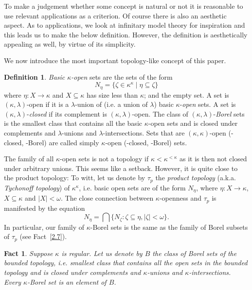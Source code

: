 \documentclass[12pt,a4paper]{amsart}
\newtheorem{fact}[thm]{Fact}
\theoremstyle{definition}
\newtheorem{defn}[thm]{Definition}
\theoremstyle{remark}
\renewcommand{\mid}{\mathrel{|}\allowbreak}
\begin{document}
To make a judgement whether some concept is natural or not it is reasonable to use relevant applications as a criterion. Of course there is also an aesthetic aspect. As to applications, we look at infinitary model theory for inspiration and this leads us to make the below definition. However, the definition is aesthetically appealing as well, by virtue of its simplicity.

We now introduce the most important topology-like concept of this paper.

\begin{defn}\label{kappaopen}
    \emph{Basic $\kappa$-open} sets are the sets of the form $$N_\eta=\{\zeta\in \kappa^\kappa\mid\eta\subseteq \zeta\}$$ where $\eta:X\rightarrow \kappa$  and $X\subseteq \kappa$ has size less than $\kappa$; and the empty set. A set is $(\kappa,\lambda)$-open if it is a $\lambda$-union of (i.e. a union of $\lambda$)  basic $\kappa$-\emph{open} sets. A set is $(\kappa,\lambda)$-\emph{closed} if its complement is $(\kappa,\lambda)$-open. The class of $(\kappa,\lambda)$-\emph{Borel}  sets is the smallest class that contains all the basic $\kappa$-open sets and is closed under complements and $\lambda$-unions and $\lambda$-intersections.
Sets that are $(\kappa,\kappa)$-open (-closed, -Borel) are called simply $\kappa$-open (-closed, -Borel) sets.
\end{defn}

The family of all $\kappa$-open sets is not a topology if $\kappa<\kappa^{<\kappa}$ as it is then not closed under arbitrary unions. This seems like a setback. However, it is quite close to the product topology: To witt, let us denote by $\tau_p$ the \textit{product topology} (a.k.a. \textit{Tychonoff topology}) of $\kappa^\kappa$, i.e. basic open sets are of the form $N_\eta$, where $\eta:X\rightarrow\kappa$, $X\subseteq \kappa$ and $|X|<\omega$. 
The close connection between $\kappa$-openness and $\tau_p$ is manifested by the equation $$N_\eta=\bigcap\{N_\zeta:\zeta\subseteq\eta, |\zeta|<\omega\}.$$ 
In particular, our family of $\kappa$-Borel sets is the same as the family of Borel subsets of $\tau_p$ (see Fact~\ref{2.7}). 

\begin{fact}Suppose $\kappa$ is regular.
    Let us denote by $B$ the class of Borel sets of the bounded topology, i.e. smallest class that contains all the open sets in the bounded topology and is closed under complements and $\kappa$-unions and $\kappa$-intersections. Every $\kappa$-Borel set is an element of $B$.
\end{fact}
\end{document}
